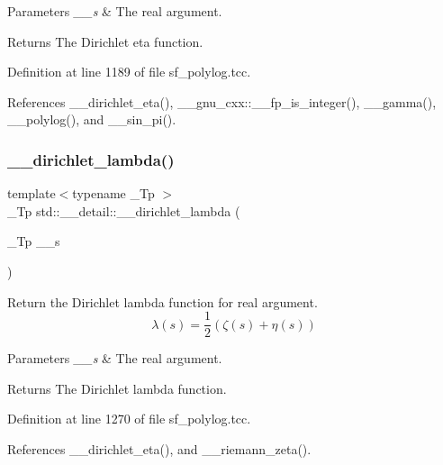 \begin{DoxyParams}{Parameters}
{\em \+\_\+\+\_\+s} & The real argument. \\
\hline
\end{DoxyParams}
\begin{DoxyReturn}{Returns}
The Dirichlet eta function. 
\end{DoxyReturn}


Definition at line 1189 of file sf\+\_\+polylog.\+tcc.



References \+\_\+\+\_\+dirichlet\+\_\+eta(), \+\_\+\+\_\+gnu\+\_\+cxx\+::\+\_\+\+\_\+fp\+\_\+is\+\_\+integer(), \+\_\+\+\_\+gamma(), \+\_\+\+\_\+polylog(), and \+\_\+\+\_\+sin\+\_\+pi().

\mbox{\label{namespacestd_1_1____detail_a6ee8ae93ba65207de8ef3d6bb162b192}} 
\subsubsection{\texorpdfstring{\+\_\+\+\_\+dirichlet\+\_\+lambda()}{\_\_dirichlet\_lambda()}}
{\footnotesize\ttfamily template$<$typename \+\_\+\+Tp $>$ \\
\+\_\+\+Tp std\+::\+\_\+\+\_\+detail\+::\+\_\+\+\_\+dirichlet\+\_\+lambda (\begin{DoxyParamCaption}\item[{\+\_\+\+Tp}]{\+\_\+\+\_\+s }\end{DoxyParamCaption})}

Return the Dirichlet lambda function for real argument. \[ \lambda(s) = \frac{1}{2}(\zeta(s) + \eta(s)) \]


\begin{DoxyParams}{Parameters}
{\em \+\_\+\+\_\+s} & The real argument. \\
\hline
\end{DoxyParams}
\begin{DoxyReturn}{Returns}
The Dirichlet lambda function. 
\end{DoxyReturn}


Definition at line 1270 of file sf\+\_\+polylog.\+tcc.



References \+\_\+\+\_\+dirichlet\+\_\+eta(), and \+\_\+\+\_\+riemann\+\_\+zeta().

